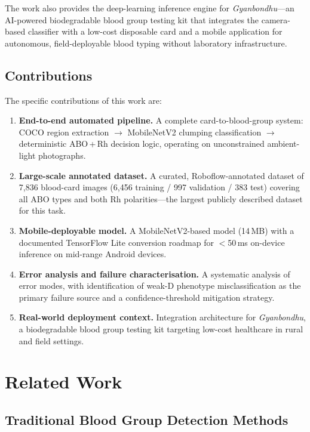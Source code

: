 \documentclass[journal]{IEEEtran}
\begin{document}
The work also provides the deep-learning inference engine for
\emph{Gyanbondhu}---an AI-powered biodegradable blood group testing
kit that integrates the camera-based classifier with a low-cost
disposable card and a mobile application for autonomous, field-deployable
blood typing without laboratory infrastructure.

\subsection{Contributions}

The specific contributions of this work are:
\begin{enumerate}
  \item \textbf{End-to-end automated pipeline.}
        A complete card-to-blood-group system: COCO region extraction
        $\rightarrow$ MobileNetV2 clumping classification
        $\rightarrow$ deterministic ABO\,+\,Rh decision logic,
        operating on unconstrained ambient-light photographs.
  \item \textbf{Large-scale annotated dataset.}
        A curated, Roboflow-annotated dataset of 7,836 blood-card
        images (6,456 training / 997 validation / 383 test) covering
        all ABO types and both Rh polarities---the largest publicly
        described dataset for this task.
  \item \textbf{Mobile-deployable model.}
        A MobileNetV2-based model (14\,MB) with a documented
        TensorFlow Lite conversion roadmap for $<$50\,ms on-device
        inference on mid-range Android devices.
  \item \textbf{Error analysis and failure characterisation.}
        A systematic analysis of error modes, with identification
        of weak-D phenotype misclassification as the primary
        failure source and a confidence-threshold mitigation strategy.
  \item \textbf{Real-world deployment context.}
        Integration architecture for \emph{Gyanbondhu}, a
        biodegradable blood group testing kit targeting low-cost
        healthcare in rural and field settings.
\end{enumerate}

\section{Related Work}
\label{sec:related}

\subsection{Traditional Blood Group Detection Methods}
\end{document}
